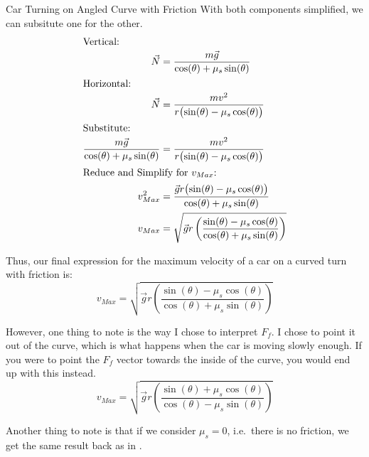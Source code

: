 \begin{example}[]{Car Turning on Angled Curve with Friction}
  With both components simplified, we can subsitute one for the other.
  \begin{align*}
    \shortintertext{Vertical:}
    \vec{N} &= \frac{m \vec{g}}{\cos(\theta) + \mu_{s} \sin(\theta)} \\
    \shortintertext{Horizontal:}
    \vec{N} &= \frac{m v^{2}}{r \bigl( \sin(\theta) - \mu_{s} \cos(\theta) \bigr)} \\
    \shortintertext{Substitute:}
    \frac{m \vec{g}}{\cos(\theta) + \mu_{s} \sin(\theta)} &= \frac{m v^{2}}{r \bigl( \sin(\theta) - \mu_{s} \cos(\theta) \bigr)} \\
    \shortintertext{Reduce and Simplify for $v_{Max}$:}
    v_{Max}^{2} &= \frac{\vec{g} r \bigl( \sin(\theta) - \mu_{s} \cos(\theta) \bigr)}{\cos(\theta) + \mu_{s} \sin(\theta)} \\
    v_{Max} &= \sqrt{\vec{g} r \left( \frac{\sin(\theta) - \mu_{s} \cos(\theta)}{\cos(\theta) + \mu_{s} \sin(\theta)} \right)} \\
  \end{align*}

  Thus, our final expression for the maximum velocity of a car on a curved turn with friction is:
  \begin{equation*}
    v_{Max} = \sqrt{\vec{g} r \left( \frac{\sin(\theta) - \mu_{s} \cos(\theta)}{\cos(\theta) + \mu_{s} \sin(\theta)} \right)}
  \end{equation*}

  However, one thing to note is the way I chose to interpret $F_{f}$.
  I chose to point it out of the curve, which is what happens when the car is moving slowly enough.
  If you were to point the $F_{f}$ vector towards the inside of the curve, you would end up with this instead.
  \begin{equation*}
    v_{Max} = \sqrt{\vec{g} r \left( \frac{\sin(\theta) + \mu_{s} \cos(\theta)}{\cos(\theta) - \mu_{s} \sin(\theta)} \right)}
  \end{equation*}

  Another thing to note is that if we consider $\mu_{s} = 0$, i.e.\ there is no friction, we get the same result back as in .
\end{example}

